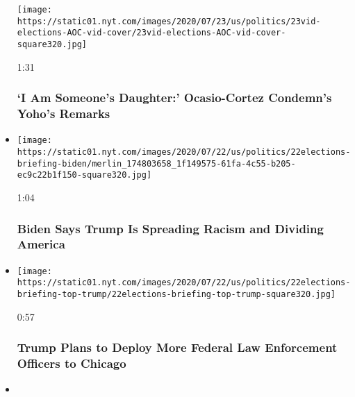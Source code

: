 \begin{itemize}
  \texttt{[image: https://static01.nyt.com/images/2020/07/23/us/politics/23vid-elections-AOC-vid-cover/23vid-elections-AOC-vid-cover-square320.jpg]}

  1:31

  \hypertarget{i-am-someones-daughter-ocasio-cortez-condemns-yohos-remarks}{%
  \subsubsection{`I Am Someone's Daughter:' Ocasio-Cortez Condemn's
  Yoho's
  Remarks}\label{i-am-someones-daughter-ocasio-cortez-condemns-yohos-remarks}}
\item
  \href{https://www.nytimes.com/video/us/100000007251300/biden-trump-racist-divide-america.html?action=click\&module=video-series-bar\&region=header\&pgtype=Article\&playlistId=video/us-politics}{}

  \texttt{[image: https://static01.nyt.com/images/2020/07/22/us/politics/22elections-briefing-biden/merlin\_174803658\_1f149575-61fa-4c55-b205-ec9c22b1f150-square320.jpg]}

  1:04

  \hypertarget{biden-says-trump-is-spreading-racism-and-dividing-america}{%
  \subsubsection{Biden Says Trump Is Spreading Racism and Dividing
  America}\label{biden-says-trump-is-spreading-racism-and-dividing-america}}
\item
  \href{https://www.nytimes.com/video/us/100000007251764/trump-surge-federal-law-enforcment.html?action=click\&module=video-series-bar\&region=header\&pgtype=Article\&playlistId=video/us-politics}{}

  \texttt{[image: https://static01.nyt.com/images/2020/07/22/us/politics/22elections-briefing-top-trump/22elections-briefing-top-trump-square320.jpg]}

  0:57

  \hypertarget{trump-plans-to-deploy-more-federal-law-enforcement-officers-to-chicago}{%
  \subsubsection{Trump Plans to Deploy More Federal Law Enforcement
  Officers to
  Chicago}\label{trump-plans-to-deploy-more-federal-law-enforcement-officers-to-chicago}}
\item
  \href{https://www.nytimes.com/video/us/100000007250230/mcconnell-proposal-relief-package.html?action=click\&module=video-series-bar\&region=header\&pgtype=Article\&playlistId=video/us-politics}{}


\end{itemize}
